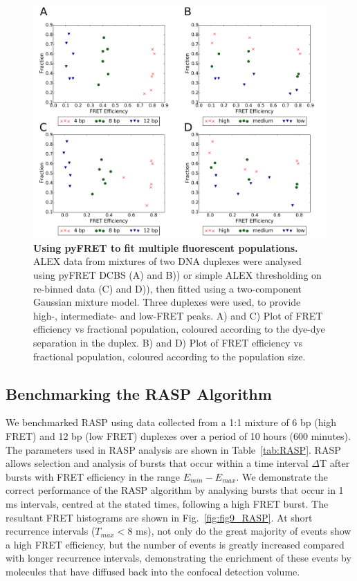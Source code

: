 \begin{figure}[!ht]
   \begin{center}
      \includegraphics*[clip=true, width=6in]{pyFRET/ratios.pdf}
      \caption{{\bf Using pyFRET to fit multiple fluorescent populations.} ALEX data from mixtures of two DNA duplexes were analysed using pyFRET DCBS (A) and B)) or simple ALEX thresholding on re-binned data (C) and D)), then fitted using a two-component Gaussian mixture model. Three duplexes were used, to provide high-, intermediate- and low-FRET peaks. A) and C) Plot of FRET efficiency vs fractional population, coloured according to the dye-dye separation in the duplex. B) and D) Plot of FRET efficiency vs fractional population, coloured according to the population size.}
      \label{fig:ratios}
   \end{center}
\end{figure}

\subsection{Benchmarking the RASP Algorithm}    
We benchmarked RASP using data collected from a 1:1 mixture of 6 bp (high FRET) and 12 bp (low FRET) duplexes over a period of 10 hours (600 minutes). The parameters used in RASP analysis are shown in Table~\ref{tab:RASP}. RASP allows selection and analysis of bursts that occur within a time interval $\Delta$T after bursts with FRET efficiency in the range $E_{min} - E_{max}$. We demonstrate the correct performance of the RASP algorithm by analysing bursts that occur in 1 ms intervals, centred at the stated times, following a high FRET burst. The resultant FRET histograms are shown in Fig.~\ref{fig:fig9_RASP}. At short recurrence intervals ($T_{max} < 8$ ms), not only do the great majority of events show a high FRET efficiency, but the number of events is greatly increased compared with longer recurrence intervals, demonstrating the enrichment of these events by molecules that have diffused back into the confocal detection volume. 



